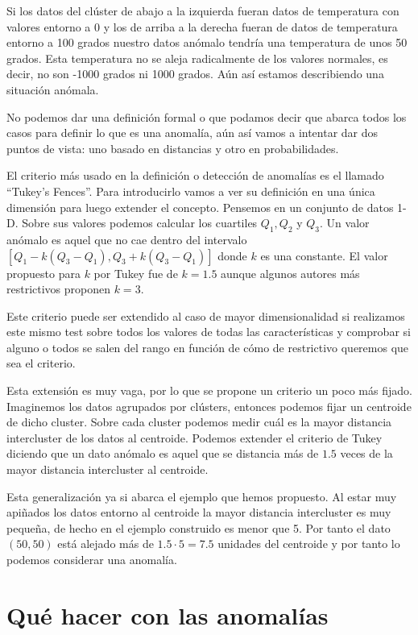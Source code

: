 Si los datos del clúster de abajo a la izquierda fueran datos de temperatura con valores entorno a 0 y los de arriba a la derecha fueran de datos de temperatura entorno a 100 grados nuestro datos anómalo tendría una temperatura de unos 50 grados. Esta temperatura no se aleja radicalmente de los valores normales, es decir, no son -1000 grados ni 1000 grados. Aún así estamos describiendo una situación anómala.

No podemos dar una definición formal o que podamos decir que abarca todos los casos para definir lo que es una anomalía, aún así vamos a intentar dar dos puntos de vista: uno basado en distancias y otro en probabilidades.

El criterio más usado en la definición o detección de anomalías es el llamado ``Tukey's Fences''. Para introducirlo vamos a ver su definición en una única dimensión para luego extender el concepto. Pensemos en un conjunto de datos 1-D. Sobre sus valores podemos calcular los cuartiles $Q_1 , Q_2 $ y $Q_3$. Un valor anómalo es aquel que no cae dentro del intervalo $[Q_1 - k(Q_3 - Q_1), Q_3 + k(Q_3 - Q_1)]$ donde $k$ es una constante. El valor propuesto para $k$ por Tukey fue de $k=1.5$ aunque algunos autores más restrictivos proponen $k=3$.

Este criterio puede ser extendido al caso de mayor dimensionalidad si realizamos este mismo test sobre todos los valores de todas las características y comprobar si alguno o todos se salen del rango en función de cómo de restrictivo queremos que sea el criterio.

Esta extensión es muy vaga, por lo que se propone un criterio un poco más fijado. Imaginemos los datos agrupados por clústers, entonces podemos fijar un centroide de dicho cluster. Sobre cada cluster podemos medir cuál es la mayor distancia intercluster de los datos al centroide. Podemos extender el criterio de Tukey diciendo que un dato anómalo es aquel que se distancia más de $1.5$ veces de la mayor distancia intercluster al centroide.

Esta generalización ya si abarca el ejemplo que hemos propuesto. Al estar muy apiñados los datos entorno al centroide la mayor distancia intercluster es muy pequeña, de hecho en el ejemplo construido es menor que 5. Por tanto el dato $(50,50)$ está alejado más de $1.5 \cdot 5 = 7.5$ unidades del centroide y por tanto lo podemos considerar una anomalía.

\section{Qué hacer con las anomalías}

